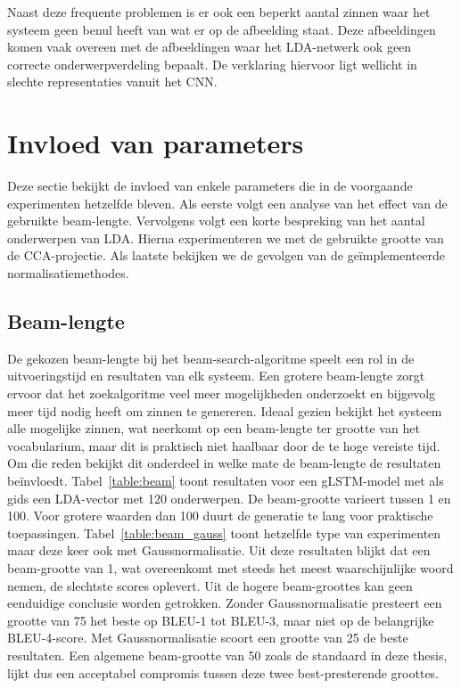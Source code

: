 Naast deze frequente problemen is er ook een beperkt aantal zinnen waar het systeem geen benul heeft van wat er op de afbeelding staat.
Deze afbeeldingen komen vaak overeen met de afbeeldingen waar het LDA-netwerk ook geen correcte onderwerpverdeling bepaalt.
De verklaring hiervoor ligt wellicht in slechte representaties vanuit het CNN.
    
\section{Invloed van parameters}
\label{sec:invloed-parameters}
Deze sectie bekijkt de invloed van enkele parameters die in de voorgaande experimenten hetzelfde bleven. Als eerste volgt een analyse van het effect van de gebruikte beam-lengte. Vervolgens volgt een korte bespreking van het aantal onderwerpen van LDA. Hierna experimenteren we met de gebruikte grootte van de CCA-projectie. Als laatste bekijken we de gevolgen van de ge\"implementeerde normalisatiemethodes.

\subsection{Beam-lengte}
De gekozen beam-lengte bij het beam-search-algoritme speelt een rol in de uitvoeringstijd en resultaten van elk systeem. 
Een grotere beam-lengte zorgt ervoor dat het zoekalgoritme veel meer mogelijkheden onderzoekt en bijgevolg meer tijd nodig heeft om zinnen te genereren.
Ideaal gezien bekijkt het systeem alle mogelijke zinnen, wat neerkomt op een beam-lengte ter grootte van het vocabularium, maar dit is praktisch niet haalbaar door de te hoge vereiste tijd.
Om die reden bekijkt dit onderdeel in welke mate de beam-lengte de resultaten be\"invloedt.
Tabel~\ref{table:beam} toont resultaten voor een gLSTM-model met als gids een LDA-vector met 120 onderwerpen. De beam-grootte varieert tussen 1 en 100. Voor grotere waarden dan 100 duurt de generatie te lang voor praktische toepassingen. Tabel~\ref{table:beam_gauss} toont hetzelfde type van experimenten maar deze keer ook met Gaussnormalisatie. Uit deze resultaten blijkt dat een beam-grootte van 1, wat overeenkomt met steeds het meest waarschijnlijke woord nemen, de slechtste scores oplevert. Uit de hogere beam-groottes kan geen eenduidige conclusie worden getrokken. Zonder Gaussnormalisatie presteert een grootte van 75 het beste op BLEU-1 tot BLEU-3, maar niet op de belangrijke BLEU-4-score. Met Gaussnormalisatie scoort een grootte van 25 de beste resultaten. Een algemene beam-grootte van 50 zoals de standaard in deze thesis, lijkt dus een acceptabel compromis tussen deze twee best-presterende groottes.

